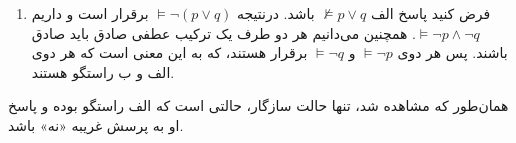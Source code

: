 \begin{ans}
\begin{enumerate}
\begin{enumerate}
      \item فرض کنید پاسخ الف $\not \vDash p \vee q$
      باشد. درنتیجه
      $\vDash \neg (p \vee q)$
      برقرار است و داریم
      $\vDash \neg p \wedge \neg q$.
      همچنین می‌دانیم هر دو طرف یک ترکیب عطفی صادق باید صادق باشند. پس هر دوی
      $\vDash \neg p$
      و
      $\vDash \neg q$
      برقرار هستند، که به این معنی است که هر دوی الف و ب راستگو هستند.
    \end{enumerate}
  \end{enumerate}
  همان‌طور که مشاهده شد، تنها حالت سازگار، حالتی است که الف راستگو بوده و پاسخ او به پرسش غریبه «نه» باشد.
\end{ans}
